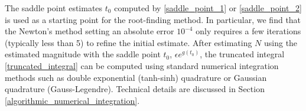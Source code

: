\documentclass[10pt,a4paper,oneside]{article}
\numberwithin{equation}{section}
\begin{document}
The saddle point estimates $t_0$ computed by \eqref{saddle_point_1} or \eqref{saddle_point_2} is used as a starting point for the root-finding method. In particular, we find that the Newton's method setting an absolute error $10^{-4}$ only requires a few iterations (typically less than 5) to refine the initial estimate. After estimating $N$ using the estimated magnitude with the saddle point $t_0$, $\epsilon e^{g(t_0)}$, the truncated integral \eqref{truncated_integral} can be computed using standard numerical integration methods such as double exponential (tanh-sinh) quadrature or Gaussian quadrature (Gauss-Legendre). Technical details are discussed in Section \ref{algorithmic_numerical_integration}.
\end{document}
